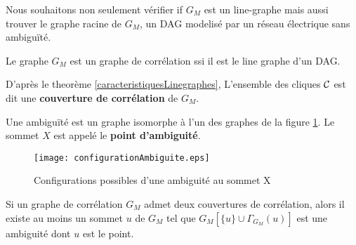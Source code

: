 Nous souhaitons non seulement v\'erifier if $G_M$ est un line-graphe mais aussi trouver le graphe racine de $G_M$, un DAG modelis\'e par un r\'eseau \'electrique sans ambigu\"{i}t\'e.
\newline 
\begin{definition}
	Le graphe $G_M$ est un graphe de corr\'elation ssi il est le line graphe d'un DAG.
\end{definition}
D'apr\`es le theor\`eme \ref{caracteristiquesLinegraphes}, L'ensemble des cliques $\cal C$ est dit une {\bf couverture de corr\'elation} de $G_M$.

\begin{definition}
Une ambigu\"{i}t\'e est un graphe isomorphe \`a l'un des graphes de la figure \ref{configurationAmbiguite}. Le sommet $X$ est appel\'e le {\bf point d'ambiguit\'e}.
\end{definition}

\begin{figure}[htb!]\vspace{-0.5em}
	\centering
	\texttt{[image: configurationAmbiguite.eps]}\vspace{-0.5em}
	\caption{ Configurations possibles d'une ambiguit\'e au sommet X }\vspace{-0.5em}
	\label{configurationAmbiguite}
\end{figure}

\begin{lemma}
	Si un graphe de corr\'elation $G_M$ admet deux couvertures de corr\'elation, alors il existe au moins un sommet $u$ de $G_M$ tel que $G_{M}[\{u\} \cup \Gamma_{G_M}(u)]$ est une ambiguit\'e dont $u$ est le point.
\end{lemma}
	
